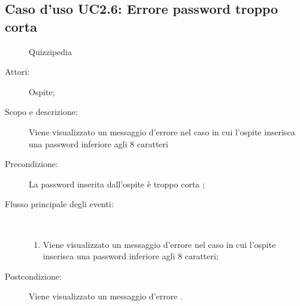 \subsection{Caso d'uso UC2.6: Errore password troppo corta}
	\begin{figure}[H]
		\centering
		\begin{resizedtikzpicture}{\textwidth}
		\begin{umlsystem}[x=0, fill=lightgray!20]{Quizzipedia}
		\end{umlsystem}
		\end{resizedtikzpicture}
		\caption{}
	\end{figure}
\begin{description}
\item[Attori:] Ospite;
\item[Scopo e descrizione:] Viene visualizzato un messaggio d'errore nel caso in cui l'ospite inserisca una password inferiore agli 8 caratteri
      \item[Precondizione:] La password inserita dall'ospite è troppo corta
;

        \item[Flusso principale degli eventi:] \ 
 \begin{enumerate}
          \item Viene visualizzato un messaggio d'errore nel caso in cui l'ospite inserisca una password inferiore agli 8 caratteri;

      \end{enumerate}
    \item[Postcondizione:] Viene visualizzato un messaggio d'errore
.
  \end{description}
\hypertarget{UC2.7}{}

